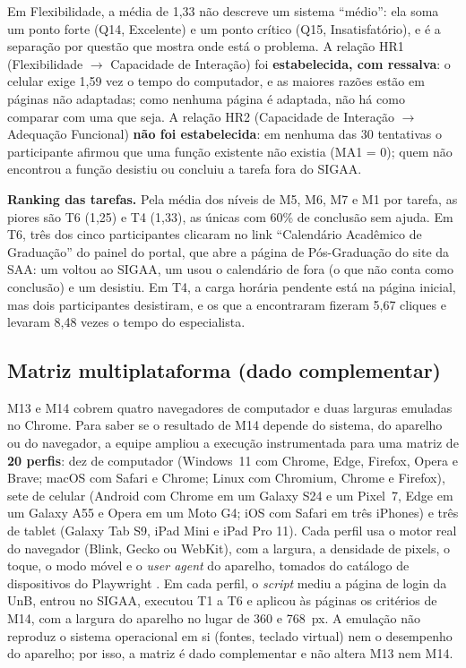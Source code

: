 Em Flexibilidade, a média de 1,33 não descreve um sistema ``médio'': ela soma um ponto forte (Q14, Excelente) e um ponto crítico (Q15, Insatisfatório), e é a separação por questão que mostra onde está o problema. A relação HR1 (Flexibilidade $\rightarrow$ Capacidade de Interação) foi \textbf{estabelecida, com ressalva}: o celular exige 1,59 vez o tempo do computador, e as maiores razões estão em páginas não adaptadas; como nenhuma página é adaptada, não há como comparar com uma que seja. A relação HR2 (Capacidade de Interação $\rightarrow$ Adequação Funcional) \textbf{não foi estabelecida}: em nenhuma das 30 tentativas o participante afirmou que uma função existente não existia (MA1 = 0); quem não encontrou a função desistiu ou concluiu a tarefa fora do SIGAA.

\textbf{Ranking das tarefas.} Pela média dos níveis de M5, M6, M7 e M1 por tarefa, as piores são T6 (1,25) e T4 (1,33), as únicas com 60\% de conclusão sem ajuda. Em T6, três dos cinco participantes clicaram no link ``Calendário Acadêmico de Graduação'' do painel do portal, que abre a página de Pós-Graduação do site da SAA: um voltou ao SIGAA, um usou o calendário de fora (o que não conta como conclusão) e um desistiu. Em T4, a carga horária pendente está na página inicial, mas dois participantes desistiram, e os que a encontraram fizeram 5,67 cliques e levaram 8,48 vezes o tempo do especialista.

\subsection{Matriz multiplataforma (dado complementar)}
\label{sec:matriz}

M13 e M14 cobrem quatro navegadores de computador e duas larguras emuladas no Chrome. Para saber se o resultado de M14 depende do sistema, do aparelho ou do navegador, a equipe ampliou a execução instrumentada para uma matriz de \textbf{20 perfis}: dez de computador (Windows~11 com Chrome, Edge, Firefox, Opera e Brave; macOS com Safari e Chrome; Linux com Chromium, Chrome e Firefox), sete de celular (Android com Chrome em um Galaxy S24 e um Pixel~7, Edge em um Galaxy A55 e Opera em um Moto G4; iOS com Safari em três iPhones) e três de tablet (Galaxy Tab S9, iPad Mini e iPad Pro 11). Cada perfil usa o motor real do navegador (Blink, Gecko ou WebKit), com a largura, a densidade de pixels, o toque, o modo móvel e o \textit{user agent} do aparelho, tomados do catálogo de dispositivos do Playwright \cite{playwright}. Em cada perfil, o \textit{script} mediu a página de login da UnB, entrou no SIGAA, executou T1 a T6 e aplicou às páginas os critérios de M14, com a largura do aparelho no lugar de 360 e 768~px. A emulação não reproduz o sistema operacional em si (fontes, teclado virtual) nem o desempenho do aparelho; por isso, a matriz é dado complementar e não altera M13 nem M14.

